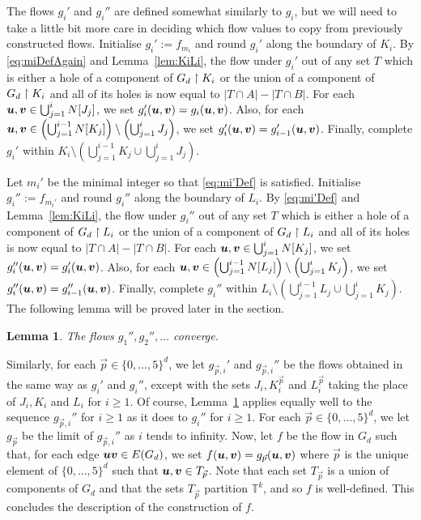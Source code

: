 \documentclass[12pt,a4paper]{amsart}
\numberwithin{equation}{section}
\newtheorem{lemma}[equation]{Lemma}
\theoremstyle{definition}
\begin{document}
The flows $g_i'$ and $g_i''$ are defined somewhat similarly to $g_i$, but we will need to take a little bit more care in deciding which flow values to copy from previously constructed flows. Initialise $g_i':=f_{m_i}$ and round $g_i'$ along the boundary of $K_i$. By \eqref{eq:miDefAgain} and Lemma~\ref{lem:KiLi}, the flow under $g_i'$ out of any set $T$ which is either a hole of a component of $G_d\upharpoonright K_i$ or the union of a component of $G_d\upharpoonright K_i$ and all of its holes is now equal to $|T\cap A|-|T\cap B|$. For each $\boldsymbol{u},\boldsymbol{v}\in \bigcup_{j=1}^iN[J_j]$, we set $g_i'(\boldsymbol{u},\boldsymbol{v})=g_i(\boldsymbol{u},\boldsymbol{v})$. Also, for each $\boldsymbol{u},\boldsymbol{v}\in \left(\bigcup_{j=1}^{i-1}N[K_j]\right)\setminus \left(\bigcup_{j=1}^i J_j\right)$, we set $g_i'(\boldsymbol{u},\boldsymbol{v})=g_{i-1}'(\boldsymbol{u},\boldsymbol{v})$. Finally, complete $g_{i}'$ within $K_i\setminus\left(\bigcup_{j=1}^{i-1}K_j\cup \bigcup_{j=1}^iJ_j\right)$. 

Let $m_i'$ be the minimal integer so that \eqref{eq:mi'Def} is satisfied. Initialise $g_i'':=f_{m_i'}$ and round $g_i''$ along the boundary of $L_i$. By \eqref{eq:mi'Def} and Lemma~\ref{lem:KiLi}, the flow under $g_i''$ out of any set $T$ which is either a hole of a component of $G_d\upharpoonright L_i$ or the union of a component of $G_d\upharpoonright L_i$ and all of its holes is now equal to $|T\cap A|-|T\cap B|$. For each $\boldsymbol{u},\boldsymbol{v}\in \bigcup_{j=1}^iN[K_j]$, we set $g_i''(\boldsymbol{u},\boldsymbol{v})=g_i'(\boldsymbol{u},\boldsymbol{v})$. Also, for each $\boldsymbol{u},\boldsymbol{v}\in \left(\bigcup_{j=1}^{i-1}N[L_j]\right)\setminus \left(\bigcup_{j=1}^i K_j\right)$, we set $g_i''(\boldsymbol{u},\boldsymbol{v})=g_{i-1}''(\boldsymbol{u},\boldsymbol{v})$. Finally, complete $g_{i}''$ within $L_i\setminus\left(\bigcup_{j=1}^{i-1}L_j\cup \bigcup_{j=1}^iK_j\right)$. The following lemma will be proved later in the section.

\begin{lemma}
\label{lem:gi''Conv}
The flows $g_1'',g_2'',\dots$ converge.
\end{lemma}

Similarly, for each $\vec{p}\in\{0,\dots,5\}^d$, we let $g_{\vec{p},i}'$ and $g_{\vec{p},i}''$ be the flows obtained in the same way as $g_i'$ and $g_i''$, except with the sets $J_i,K_i^{\vec{p}}$ and $L_i^{\vec{p}}$ taking the place of $J_i,K_i$ and $L_i$ for $i\geq1$. Of course, Lemma~\ref{lem:gi''Conv} applies equally well to the sequence $g_{\vec{p},i}''$ for $i\geq1$ as it does to $g_i''$ for $i\geq1$. For each $\vec{p}\in \{0,\dots,5\}^d$, we let $g_{\vec{p}}$ be the limit of $g_{\vec{p},i}''$ as $i$ tends to infinity. Now, let $f$ be the flow in $G_d$ such that, for each edge $\boldsymbol{u}\boldsymbol{v}\in E(G_d)$, we set $f(\boldsymbol{u},\boldsymbol{v})= g_{\vec{p}}(\boldsymbol{u},\boldsymbol{v})$ where $\vec{p}$ is the unique element of $\{0,\dots,5\}^d$ such that $\boldsymbol{u},\boldsymbol{v}\in T_{\vec{p}}$. Note that each set $T_{\vec{p}}$ is a union of components of $G_d$ and that the sets $T_{\vec{p}}$ partition $\mathbb{T}^k$, and so $f$ is well-defined. This concludes the description of the construction of $f$.
\end{document}
